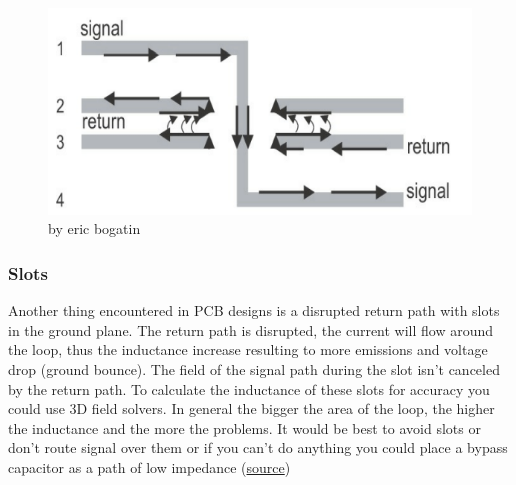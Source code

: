 \documentclass[final]{cubedoc}
\begin{document}
	\begin{figure}[h!]
		\centering
		\includegraphics[width=\textwidth, height=.25\textheight]{assets/change_layer2.png}
		\caption{by eric bogatin}
	\end{figure}
	
	
	
	\subsubsection{Slots}
	
	Another thing encountered in PCB designs is a disrupted return path with slots in the ground plane. The return path is disrupted, the current will flow around the loop, thus the inductance increase resulting to more emissions and voltage drop (ground bounce). The field of the signal path during the slot isn't canceled by the return path. To calculate the inductance of these slots for accuracy you could use 3D field solvers. In general the bigger the area of the loop, the higher the inductance and the more the problems. It would be best to avoid slots or don't route signal over them or if you can't do anything you could place a bypass capacitor as a path of low impedance (\href{https://electronics.stackexchange.com/questions/81761/whats-radiating-on-my-pcb}{source})
	
	
	
\end{document}
